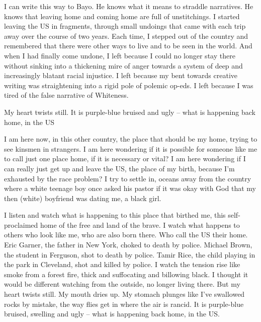 \documentclass[../main.tex]{subfiles}
\begin{document}
\begin{multicols}{2}
\begin{blockquote}
 
\end{blockquote}

I can write this way to Bayo. He knows what it means to straddle narratives. He knows that leaving home and coming home are full of unstitchings. I started leaving the US in fragments, through small undoings that came with each trip away over the course of two years. Each time, I stepped out of the country and remembered that there were other ways to live and to be seen in the world. And when I had finally come undone, I left because I could no longer stay there without sinking into a thickening mire of anger towards a system of deep and increasingly blatant racial injustice. I left because my bent towards creative writing was straightening into a rigid pole of polemic op-eds. I left because I was tired of the false narrative of Whiteness. 

\begin{pullquote}
 My heart twists still. It is purple-blue bruised and ugly – what is happening back home, in the US 
\end{pullquote}

I am here now, in this other country, the place that should be my home, trying to see kinsmen in strangers. I am here wondering if it is possible for someone like me to call just one place home, if it is necessary or vital? I am here wondering if I can really just get up and leave the US, the place of my birth, because I’m exhausted by the race problem? I try to settle in, oceans away from the country where a white teenage boy once asked his pastor if it was okay with God that my then (white) boyfriend was dating me, a black girl. 

I listen and watch what is happening to this place that birthed me, this self-proclaimed home of the free and land of the brave. I watch what happens to others who look like me, who are also born there. Who call the US their home. Eric Garner, the father in New York, choked to death by police. Michael Brown, the student in Ferguson, shot to death by police. Tamir Rice, the child playing in the park in Cleveland, shot and killed by police. I watch the tension rise like smoke from a forest fire, thick and suffocating and billowing black. I thought it would be different watching from the outside, no longer living there. But my heart twists still. My mouth dries up. My stomach plunges like I’ve swallowed rocks by mistake, the way flies get in where the air is rancid. It is purple-blue bruised, swelling and ugly – what is happening back home, in the US. 


\end{multicols}
\end{document}
